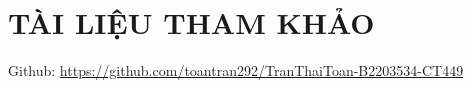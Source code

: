 \documentclass{article} %
\renewcommand{\figurename}{\fontsize{12pt}{0pt}\selectfont \bfseries Hình}
\begin{document}



\tableofcontents
\thispagestyle{empty}
\cleardoublepage


{
  \let\oldnumberline\numberline
  \renewcommand{\numberline}{\figurename~\oldnumberline}
  \listoffigures
}
\cleardoublepage


\newpage

\newpage

\section*{TÀI LIỆU THAM KHẢO}
\renewcommand\UrlFont{\color{blue}\rmfamily\itshape}
Github: \url{https://github.com/toantran292/TranThaiToan-B2203534-CT449}
\end{document}
